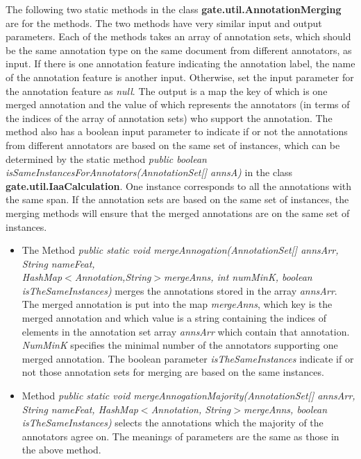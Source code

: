 The following two static methods in the class {\bf gate.util.AnnotationMerging} are for
 the methods. The two methods have very similar input and output parameters. 
Each of the methods takes an array of annotation sets, which should be the same
annotation type on the same document from different annotators, as input. If there is
one annotation feature indicating the annotation label, the name of the annotation
feature is another input. Otherwise, set the input parameter for the annotation 
feature as {\em null}. The output is a map the key of which is one merged annotation 
and the value of which represents the annotators (in terms of the indices of the array 
of annotation sets) who support the annotation. The method also has a boolean 
input parameter to indicate if or not the annotations from different annotators 
are based on the same set of instances, which can be determined by the static method 
{\em public boolean isSameInstancesForAnnotators(AnnotationSet[] annsA)} in the class
{\bf gate.util.IaaCalculation}. One instance corresponds to all the annotations with the same span.
If the annotation sets are based on the same set of instances, the merging methods
will ensure that the merged annotations are on the same set of instances. 

\begin{itemize}
\item The Method {\em public static void mergeAnnogation(AnnotationSet[] annsArr,
    String nameFeat,\\  HashMap$<$Annotation,String$>$mergeAnns, int numMinK, 
boolean isTheSameInstances)} merges the annotations
stored in the array {\em annsArr}. The merged annotation is put into the map {\em mergeAnns},
which key is the merged annotation and which value is a string containing the indices of
elements in the annotation set array  {\em annsArr} which contain that annotation.
{\em NumMinK} specifies the minimal number of the annotators supporting one
merged annotation. The boolean parameter {\em isTheSameInstances} indicate if or not
those annotation sets for merging are based on the same instances.
\item Method {\em public static void mergeAnnogationMajority(AnnotationSet[] annsArr, String nameFeat,
    HashMap$<$Annotation, String$>$mergeAnns, boolean isTheSameInstances)} selects the annotations
which the majority of the annotators agree on. The meanings of parameters are the 
same as those in the above method.
\end{itemize}

